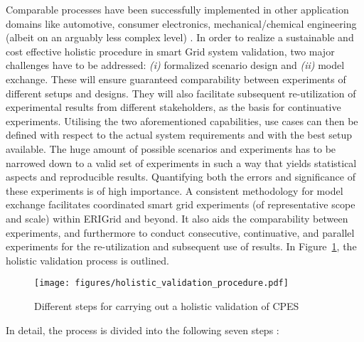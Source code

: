 \documentclass[runningheads,a4paper]{llncs}
\begin{document}
Comparable processes have been successfully implemented in other application domains like automotive, consumer electronics, mechanical/chemical engineering (albeit on an arguably less complex level) \cite{Bringmann:2008,Fouchal:2016}. In order to realize a sustainable and cost effective holistic procedure in smart Grid system validation, two major challenges have to be addressed: \textit{(i)} formalized scenario design and \textit{(ii)} model exchange. These will ensure guaranteed comparability between experiments of different setups and designs. They will also facilitate subsequent re-utilization of experimental results from different stakeholders, as the basis for continuative experiments. Utilising the two aforementioned capabilities, use cases can then be defined with respect to the actual system requirements and with the best setup available. The huge amount of possible scenarios and experiments has to be narrowed down to a valid set of experiments in such a way that yields statistical aspects and reproducible results. Quantifying both the errors and significance of these experiments is of high importance. A consistent methodology for model exchange facilitates coordinated smart grid experiments (of representative scope and scale) within ERIGrid and beyond. It also aids the comparability between experiments, and furthermore to conduct consecutive, continuative, and parallel experiments for the re-utilization and subsequent use of results. In Figure~\ref{fig:holistic_validation_procedure}, the holistic validation process is outlined. \cite{Strasser:2017}  

\begin{figure}[!htbp]
	\centering
	\texttt{[image: figures/holistic\_validation\_procedure.pdf]}
	\caption{Different steps for carrying out a holistic validation of CPES}
	\label{fig:holistic_validation_procedure}
\end{figure}

In detail, the process is divided into the following seven steps \cite{Blank:2016}:
\end{document}
